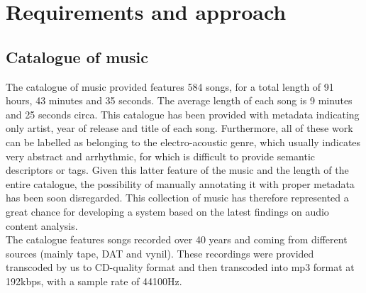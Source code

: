 \chapter{Requirements and approach} 

\label{Chapter4} 


\section{Catalogue of music}
\label{sec:catalogue}
The catalogue of music provided features 584 songs, for a total length of 91 hours, 43 minutes and 35 seconds. The average length of each song is 9 minutes and 25 seconds circa. This catalogue has been provided with metadata indicating only artist, year of release and title of each song. Furthermore, all of these work can be labelled as belonging to the electro-acoustic genre, which usually indicates very abstract and arrhythmic, for which is difficult to provide semantic descriptors or tags. Given this latter feature of the music and the length of the entire catalogue, the possibility of manually annotating it with proper metadata has been soon disregarded. This collection of music has therefore represented a great chance for developing a system based on the latest findings on audio content analysis. \\The catalogue features songs recorded over 40 years and coming from different sources (mainly tape, DAT and vynil). These recordings were provided transcoded by us to CD-quality format and then transcoded into mp3 format at 192kbps, with a sample rate of 44100Hz.

